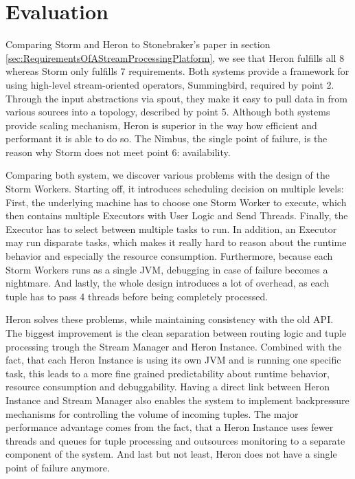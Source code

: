 \documentclass[conference]{IEEEtran}
\begin{document}
\section{Evaluation}
\label{sec:Evaluation}

Comparing Storm and Heron to Stonebraker's paper in section \ref{sec:RequirementsOfAStreamProcessingPlatform}, we see that Heron fulfills all 8 whereas Storm only fulfills 7 requirements.
Both systems provide a framework for using high-level stream-oriented operators, Summingbird, required by point 2.
Through the input abstractions via spout, they make it easy to pull data in from various sources into a topology, described by point 5.
Although both systems provide scaling mechanism, Heron is superior in the way how efficient and performant it is able to do so.
The Nimbus, the single point of failure, is the reason why Storm does not meet point 6: availability.

Comparing both system, we discover various problems with the design of the Storm Workers.
Starting off, it introduces scheduling decision on multiple levels: First, the underlying machine has to choose one Storm Worker to execute, which then contains multiple Executors with User Logic and Send Threads.
Finally, the Executor has to select between multiple tasks to run.
In addition, an Executor may run disparate tasks, which makes it really hard to reason about the runtime behavior and especially the resource consumption.
Furthermore, because each Storm Workers runs as a single JVM, debugging in case of failure becomes a nightmare.
And lastly, the whole design introduces a lot of overhead, as each tuple has to pass 4 threads before being completely processed.

Heron solves these problems, while maintaining consistency with the old API.
The biggest improvement is the clean separation between routing logic and tuple processing trough the Stream Manager and Heron Instance.
Combined with the fact, that each Heron Instance is using its own JVM and is running one specific task, this leads to a more fine grained predictability about runtime behavior, resource consumption and debuggability.
Having a direct link between Heron Instance and Stream Manager also enables the system to implement backpressure mechanisms for controlling the volume of incoming tuples.
The major performance advantage comes from the fact, that a Heron Instance uses fewer threads and queues for tuple processing and outsources monitoring to a separate component of the system.
And last but not least, Heron does not have a single point of failure anymore.  
\end{document}
